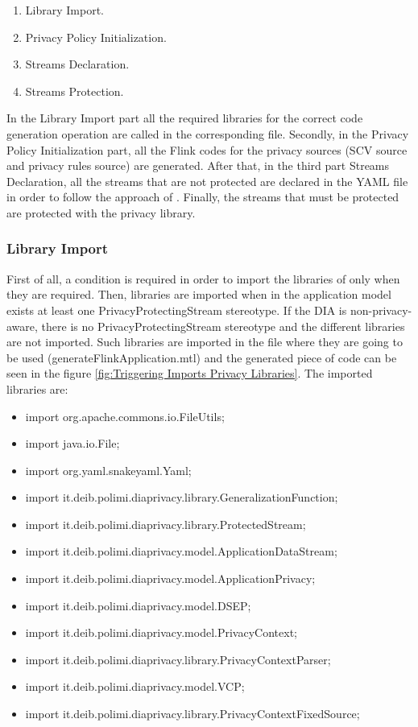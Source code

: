\begin{enumerate}
\item Library Import.
\item Privacy Policy Initialization.
\item Streams Declaration.
\item Streams Protection.
\end{enumerate}

In the Library Import part all the required libraries for the correct code generation operation are called in the corresponding file. Secondly, in the Privacy Policy Initialization part, all the Flink codes for the privacy sources (SCV source and privacy rules source) are generated. After that, in the third part Streams Declaration, all the streams that are not protected are declared in the YAML file in order to follow the approach of \cite{privacypoliciesarticle}. Finally, the streams that must be protected are protected with the privacy library.

\subsubsection{Library Import}

First of all, a condition is required in order to import the libraries of \cite{privacypoliciesarticle} only when they are required. Then, libraries are imported when in the application model exists at least one PrivacyProtectingStream stereotype. If the DIA is non-privacy-aware, there is no PrivacyProtectingStream stereotype and the different libraries are not imported. Such libraries are imported in the file where they are going to be used (generateFlinkApplication.mtl) and the generated piece of code can be seen in the figure \ref{fig:Triggering Imports Privacy Libraries}. The imported libraries are:

\begin{itemize}
\item import org.apache.commons.io.FileUtils;
\item import java.io.File;
\item import org.yaml.snakeyaml.Yaml;
\item import it.deib.polimi.diaprivacy.library.GeneralizationFunction;
\item import it.deib.polimi.diaprivacy.library.ProtectedStream;
\item import it.deib.polimi.diaprivacy.model.ApplicationDataStream;
\item import it.deib.polimi.diaprivacy.model.ApplicationPrivacy;
\item import it.deib.polimi.diaprivacy.model.DSEP;
\item import it.deib.polimi.diaprivacy.model.PrivacyContext;
\item import it.deib.polimi.diaprivacy.library.PrivacyContextParser;
\item import it.deib.polimi.diaprivacy.model.VCP;
\item import it.deib.polimi.diaprivacy.library.PrivacyContextFixedSource;
\end{itemize}

